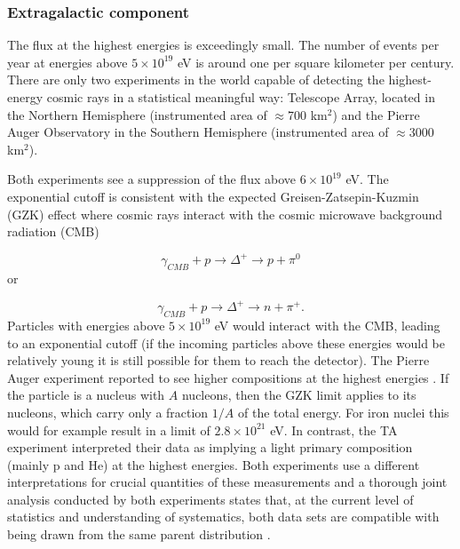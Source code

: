 \subsubsection{Extragalactic component}
\label{subsec:extragalactic}
The flux at the highest energies is exceedingly small. The number of events per year at energies above $5 \times 10^{19}$ eV is around one per square kilometer per century. There are only two experiments in the world capable of detecting the highest-energy cosmic rays in a statistical meaningful way: Telescope Array, located in the Northern Hemisphere (instrumented area of $\approx$700 km$^2$) and the Pierre Auger Observatory in the Southern Hemisphere (instrumented area of $\approx$3000 km$^2$).

Both experiments see a suppression of the flux above $6 \times 10^{19}$ eV. The exponential cutoff is consistent with the expected Greisen-Zatsepin-Kuzmin (GZK) effect \cite{Greisen:1966jv,Zatsepin:1966jv} where cosmic rays interact with the cosmic microwave background radiation (CMB)

\begin{equation}
\gamma_{CMB} + p \rightarrow \Delta^+ \rightarrow p + \pi^0
\end{equation} 
or

\begin{equation}
\gamma_{CMB} + p \rightarrow \Delta^+ \rightarrow n + \pi^+.
\end{equation}
Particles with energies above $5 \times 10^{19}$ eV would interact with the CMB, leading to an exponential cutoff (if the incoming particles above these energies would be relatively young it is still possible for them to reach the detector). The Pierre Auger experiment reported to see higher compositions at the highest energies \cite{icrc2017:pa}. If the particle is a nucleus with $A$ nucleons, then the GZK limit applies to its nucleons, which carry only a fraction $1/A$ of the total energy. For iron nuclei this would for example result in a limit of $2.8 \times 10^{21}$ eV. In contrast, the TA experiment interpreted their data as implying a light primary composition (mainly p and He) at the highest energies. Both experiments use a different interpretations for crucial quantities of these measurements and a thorough joint analysis conducted by both experiments states that, at the current level of statistics and understanding of systematics, both data sets are compatible with being drawn from the same parent distribution \cite{PDG2018url}.


